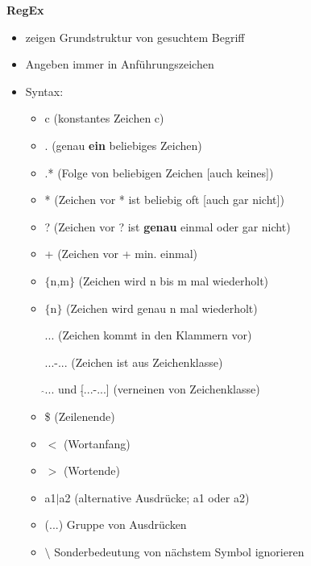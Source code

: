 \documentclass{article}
\begin{document}
\textbf{RegEx}
\begin{itemize}
	\item zeigen Grundstruktur von gesuchtem Begriff
	\item Angeben immer in Anführungszeichen
	\item Syntax:
	\begin{itemize}
		\item c (konstantes Zeichen c)
		\item . (genau \textbf{ein} beliebiges Zeichen)
		\item .* (Folge von beliebigen Zeichen [auch keines])
		\item * (Zeichen vor * ist beliebig oft [auch gar nicht])
		\item ? (Zeichen vor ? ist \textbf{genau} einmal oder gar nicht)
		\item + (Zeichen vor + min. einmal)
		\item $\{$n,m$\}$ (Zeichen wird n bis m mal wiederholt)
		\item $\{$n$\}$ (Zeichen wird genau n mal wiederholt)
		\item [...] (Zeichen kommt in den Klammern vor)
		\item [...-...] (Zeichen ist aus Zeichenklasse)
		\item [$\hat{}$...] und [$\hat{}$...-...] (verneinen von Zeichenklasse)
		\item \$ (Zeilenende)
		\item $<$ (Wortanfang)
		\item $>$ (Wortende)
		\item a1$\mid$a2 (alternative Ausdrücke; a1 oder a2)
		\item (...) Gruppe von Ausdrücken
		\item $\setminus$ Sonderbedeutung von nächstem Symbol ignorieren
	\end{itemize}
\end{itemize}
\end{document}
